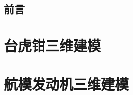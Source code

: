 \documentclass[a4paper,twoside]{book}
\begin{document}

\title{}
\author{}
\date{\today}
\maketitle
\frontmatter
\tableofcontents
\chapter*{前言}
\mainmatter
\graphicspath{{pdf/}{png/}}






\part{台虎钳三维建模}








\part{航模发动机三维建模}









\backmatter
\appendix
\noindent
\begin{landscape}

\end{landscape}
\printindex
\end{document}
